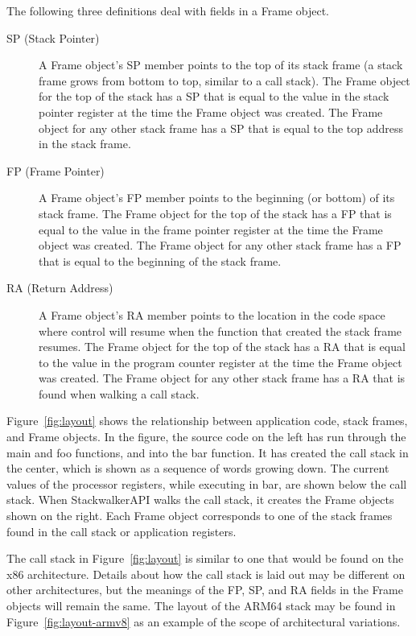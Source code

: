 The following three definitions deal with fields in a Frame object.
\begin{description}

\item [SP (Stack Pointer)] A Frame object's SP member points to the top of its
    stack frame (a stack frame grows from bottom to top, similar to a call
    stack). The Frame object for the top of the stack has a SP that is equal to
    the value in the stack pointer register at the time the Frame object was
    created. The Frame object for any other stack frame has a SP that is equal
    to the top address in the stack frame.

\item [FP (Frame Pointer)] A Frame object's FP member points to the beginning
    (or bottom) of its stack frame. The Frame object for the top of the stack
    has a FP that is equal to the value in the frame pointer register at the
    time the Frame object was created. The Frame object for any other stack
    frame has a FP that is equal to the beginning of the stack frame.

\item [RA (Return Address)] A Frame object's RA member points to the location in
    the code space where control will resume when the function that created the
    stack frame resumes. The Frame object for the top of the stack has a RA that
    is equal to the value in the program counter register at the time the Frame
    object was created.  The Frame object for any other stack frame has a RA
    that is found when walking a call stack.

\end{description}




Figure~\ref{fig:layout} shows the relationship between application code, stack
frames, and Frame objects. In the figure, the source code on the left has run
through the main and foo functions, and into the bar function. It has created
the call stack in the center, which is shown as a sequence of words growing
down. The current values of the processor registers, while executing in bar, are
shown below the call stack. When StackwalkerAPI walks the call stack, it creates
the Frame objects shown on the right. Each Frame object corresponds to one of
the stack frames found in the call stack or application registers.

The call stack in Figure~\ref{fig:layout} is similar to one that would be found
on the x86 architecture. Details about how the call stack is laid out may be
different on other architectures, but the meanings of the FP, SP, and RA fields
in the Frame objects will remain the same. The layout of the ARM64 stack may be found in Figure~\ref{fig:layout-armv8} as an example of the scope of architectural variations.


